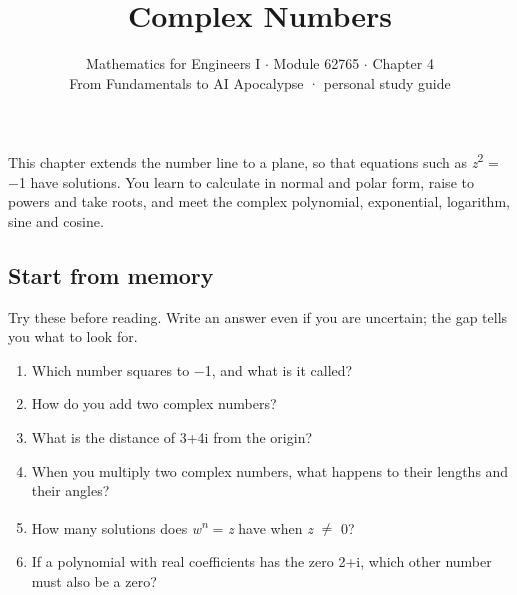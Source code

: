 \documentclass[11pt]{article}
\title{\sffamily\bfseries\color{FAUblue}Complex Numbers}
\author{Mathematics for Engineers I \ensuremath{\cdot} Module 62765 \ensuremath{\cdot} Chapter 4\\[2pt]\small From Fundamentals to AI Apocalypse · personal study guide}
\date{}
\begin{document}
\maketitle
\begingroup\footnotesize\setlength{\parskip}{0pt}\tableofcontents\endgroup
\clearpage

{\large This chapter extends the number line to a plane, so that equations such as \textit{z}\textsuperscript{2} = \ensuremath{-}1 have solutions. You learn to calculate in normal and polar form, raise to powers and take roots, and meet the complex polynomial, exponential, logarithm, sine and cosine.}


\begin{keepsection}
\section{Start from memory}

Try these before reading. Write an answer even if you are uncertain; the gap tells you what to look for.

\begin{enumerate}
\item Which number squares to \ensuremath{-}1, and what is it called?
\item How do you add two complex numbers?
\item What is the distance of 3+4i from the origin?
\item When you multiply two complex numbers, what happens to their lengths and their angles?
\item How many solutions does \textit{w}\textsuperscript{\textit{n}} = \textit{z} have when \textit{z} \ensuremath{\neq} 0?
\item If a polynomial with real coefficients has the zero 2+i, which other number must also be a zero?
\end{enumerate}

\end{keepsection}
\end{document}
